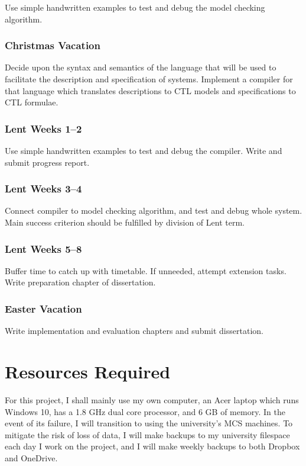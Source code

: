 \documentclass[12pt,a4paper,twoside]{article}
\begin{document}
Use simple handwritten examples to test and debug the model checking algorithm.

\subsubsection*{Christmas Vacation}

Decide upon the syntax and semantics of the language that will be used to
facilitate the description and specification of systems. Implement a compiler
for that language which translates descriptions to CTL models and specifications
to CTL formulae.

\subsubsection*{Lent Weeks 1--2}

Use simple handwritten examples to test and debug the compiler. Write and submit progress report.

\subsubsection*{Lent Weeks 3--4}

Connect compiler to model checking algorithm, and test and debug whole system.
Main success criterion should be fulfilled by division of Lent term.

\subsubsection*{Lent Weeks 5--8}

Buffer time to catch up with timetable. If unneeded, attempt
extension tasks. Write preparation chapter of dissertation.

\subsubsection*{Easter Vacation}

Write implementation and evaluation chapters and submit dissertation.

\section*{Resources Required}

For this project, I shall mainly use my own computer,
an Acer laptop which runs Windows 10, has a 1.8 GHz dual core processor,
and 6 GB of memory. In the event of its failure, I will transition to using
the university's MCS machines. To mitigate the risk of loss of data,
I will make backups to my university filespace each day I work on the project,
and I will make weekly backups to both Dropbox and OneDrive.
\end{document}
